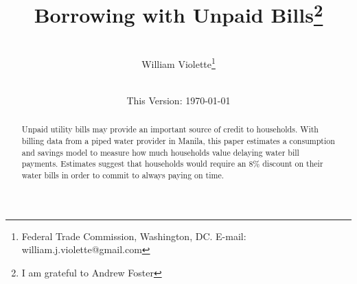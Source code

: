 \documentclass[12pt]{article}
\begin{document}
\begin{titlepage} 
\title{{Borrowing with Unpaid Bills}\thanks{I am grateful to Andrew Foster}}
\author{\\[3em]
  William Violette\thanks{Federal Trade Commission, Washington, DC. E-mail: william.j.violette@gmail.com} \\
 \\ 
  }
\vspace{30mm}
\date{\vspace{5mm}This Version: \today}
\maketitle
\begin{abstract}





Unpaid utility bills may provide an important source of credit to households.  With billing data from a piped water provider in Manila, this paper estimates a consumption and savings model to measure how much households value delaying water bill payments.  Estimates suggest that households would require an 8\% discount on their water bills in order to commit to always paying  on time.  









\end{abstract}
\end{titlepage}
\end{document}
